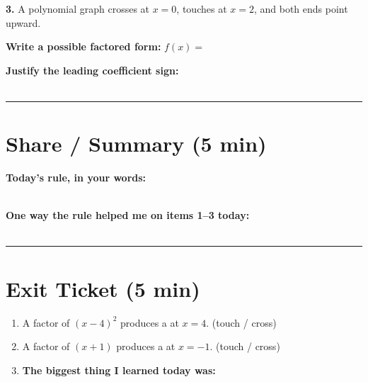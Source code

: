 \documentclass[11pt]{article}
\newcommand{\framedline}[1]{\underline{\hspace{#1}}}
\begin{document}
\vspace{0.2em}

\textbf{3.} A polynomial graph crosses at $x = 0$, touches at $x = 2$, and both ends point upward.

\textbf{Write a possible factored form:} $f(x) = $ \framedline{4in}

\vspace{3pt}
\textbf{Justify the leading coefficient sign:} \\
\framedline{5.5in} \\[5pt]
\framedline{5.5in}

\vspace{0.4em}
\hrule

\section*{Share / Summary (5 min)}

\textbf{Today's rule, in your words:} \\
\framedline{6in} \\[4pt]
\framedline{6in}

\textbf{One way the rule helped me on items 1--3 today:} \\
\framedline{6in} \\[4pt]
\framedline{6in}

\vspace{0.2em}
\hrule

\section*{Exit Ticket (5 min)}

\begin{enumerate}[label=\textbf{\arabic*.}, leftmargin=*]
    \item A factor of $(x-4)^2$ produces a \framedline{2in} at $x = 4$. \quad (touch / cross)
    \item A factor of $(x+1)$ produces a \framedline{2in} at $x = -1$. \quad (touch / cross)
    \item \textbf{The biggest thing I learned today was:} \\
        \framedline{6in} \\[4pt]
        \framedline{6in}
\end{enumerate}
\end{document}
